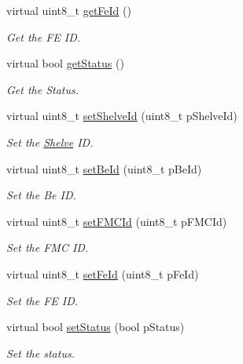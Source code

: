 \begin{DoxyCompactItemize}
virtual uint8\-\_\-t \hyperlink{class_ph2___hw_description_1_1_front_end_description_ad06faa4f2096e3324857a0c6d0b227b4}{get\-Fe\-Id} ()
\begin{DoxyCompactList}\small\item\em Get the F\-E I\-D. \end{DoxyCompactList}\item 
virtual bool \hyperlink{class_ph2___hw_description_1_1_front_end_description_ad5b25135c78f750c36673a8861395426}{get\-Status} ()
\begin{DoxyCompactList}\small\item\em Get the Status. \end{DoxyCompactList}\item 
virtual uint8\-\_\-t \hyperlink{class_ph2___hw_description_1_1_front_end_description_a97a696025936be0a15120568bfc2b7f4}{set\-Shelve\-Id} (uint8\-\_\-t p\-Shelve\-Id)
\begin{DoxyCompactList}\small\item\em Set the \hyperlink{class_ph2___hw_description_1_1_shelve}{Shelve} I\-D. \end{DoxyCompactList}\item 
virtual uint8\-\_\-t \hyperlink{class_ph2___hw_description_1_1_front_end_description_a25f69174ff9235506ba724a9d3a73258}{set\-Be\-Id} (uint8\-\_\-t p\-Be\-Id)
\begin{DoxyCompactList}\small\item\em Set the Be I\-D. \end{DoxyCompactList}\item 
virtual uint8\-\_\-t \hyperlink{class_ph2___hw_description_1_1_front_end_description_a55bea01460c40941b418f8cf45b50866}{set\-F\-M\-C\-Id} (uint8\-\_\-t p\-F\-M\-C\-Id)
\begin{DoxyCompactList}\small\item\em Set the F\-M\-C I\-D. \end{DoxyCompactList}\item 
virtual uint8\-\_\-t \hyperlink{class_ph2___hw_description_1_1_front_end_description_aef118ad340a54c824da417c9f36816d7}{set\-Fe\-Id} (uint8\-\_\-t p\-Fe\-Id)
\begin{DoxyCompactList}\small\item\em Set the F\-E I\-D. \end{DoxyCompactList}\item 
virtual bool \hyperlink{class_ph2___hw_description_1_1_front_end_description_a52c109ef30172eef0e74bf6a2370ca71}{set\-Status} (bool p\-Status)
\begin{DoxyCompactList}\small\item\em Set the status. \end{DoxyCompactList}\end{DoxyCompactItemize}
